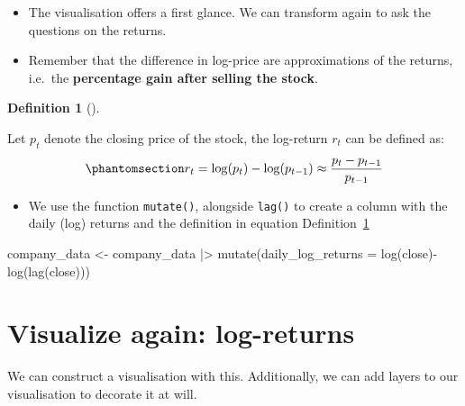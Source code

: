 \documentclass[
  letterpaper,
  DIV=11,
  numbers=noendperiod]{scrreprt}
\newenvironment{Shaded}{\begin{snugshade}}{\end{snugshade}}
\newcommand{\AttributeTok}[1]{\textcolor[rgb]{0.40,0.45,0.13}{#1}}
\newcommand{\FunctionTok}[1]{\textcolor[rgb]{0.28,0.35,0.67}{#1}}
\newcommand{\NormalTok}[1]{\textcolor[rgb]{0.00,0.23,0.31}{#1}}
\newcommand{\OtherTok}[1]{\textcolor[rgb]{0.00,0.23,0.31}{#1}}
\newcommand{\SpecialCharTok}[1]{\textcolor[rgb]{0.37,0.37,0.37}{#1}}
\providecommand{\tightlist}{%
  \setlength{\itemsep}{0pt}\setlength{\parskip}{0pt}}\usepackage{longtable,booktabs,array}
\theoremstyle{definition}
\newtheorem{definition}{Definition}[chapter]
\theoremstyle{remark}
\begin{document}
\begin{itemize}
\item
  The visualisation offers a first glance. We can transform again to ask
  the questions on the returns.
\item
  Remember that the difference in log-price are approximations of the
  returns, i.e.~the \textbf{percentage gain after selling the stock}.
\end{itemize}

\begin{definition}[]\protect\hypertarget{def-log-returns}{}\label{def-log-returns}

Let \(p_t\) denote the closing price of the stock, the log-return
\(r_t\) can be defined as:
\begin{equation}\phantomsection\label{eq-return-definition}{
r_t = \log(p_t) - \log(p_{t-1}) \approx \frac{p_t - p_{t-1}}{p_{t-1}}
}\end{equation}

\end{definition}

\begin{itemize}
\tightlist
\item
  We use the function \texttt{mutate()}, alongside \texttt{lag()} to
  create a column with the daily (log) returns and the definition in
  equation Definition~\ref{def-log-returns}
\end{itemize}

\begin{Shaded}
\begin{Highlighting}[]
\NormalTok{company\_data }\OtherTok{\textless{}{-}}\NormalTok{ company\_data }\SpecialCharTok{|\textgreater{}} 
  \FunctionTok{mutate}\NormalTok{(}\AttributeTok{daily\_log\_returns =} \FunctionTok{log}\NormalTok{(close)}\SpecialCharTok{{-}}\FunctionTok{log}\NormalTok{(}\FunctionTok{lag}\NormalTok{(close)))}
\end{Highlighting}
\end{Shaded}

\section{Visualize again:
log-returns}\label{visualize-again-log-returns}

We can construct a visualisation with this. Additionally, we can add
layers to our visualisation to decorate it at will.
\end{document}
